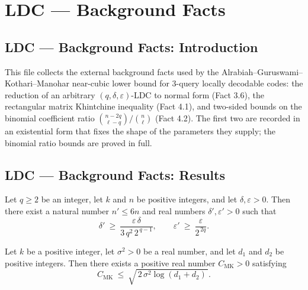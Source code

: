 \section{LDC --- Background Facts}
\subsection*{LDC --- Background Facts: Introduction}

This file collects the external background facts used by the Alrabiah--Guruswami--Kothari--Manohar
near-cubic lower bound for $3$-query locally decodable codes: the reduction of an arbitrary
$(q,\delta,\varepsilon)$-LDC to normal form (Fact 3.6), the rectangular matrix Khintchine
inequality (Fact 4.1), and two-sided bounds on the binomial coefficient ratio
$\binom{n-2q}{\ell-q}/\binom{n}{\ell}$ (Fact 4.2).  The first two are recorded in an
existential form that fixes the shape of the parameters they supply; the binomial ratio
bounds are proved in full.

\subsection*{LDC --- Background Facts: Results}

\begin{theorem}
\label{normal_form_reduction}
\leanok
{}
Let $q \ge 2$ be an integer, let $k$ and $n$ be positive integers, and let $\delta,
\varepsilon > 0$. Then there exist a natural number $n' \le 6n$ and real numbers
$\delta', \varepsilon' > 0$ such that
\[
  \delta' \ \ge\ \frac{\varepsilon\,\delta}{3\,q^{2}\,2^{\,q-1}},
  \qquad
  \varepsilon' \ \ge\ \frac{\varepsilon}{2^{\,2q}}.
\]
\end{theorem}

\begin{theorem}
\label{matrix_khintchine}
\leanok
{}
Let $k$ be a positive integer, let $\sigma^2 > 0$ be a real number, and let $d_1$ and
$d_2$ be positive integers. Then there exists a positive real number $C_{\mathrm{MK}} >
0$ satisfying
\[
  C_{\mathrm{MK}} \ \le\ \sqrt{\,2\,\sigma^2 \log(d_1 + d_2)\,}.
\]
\end{theorem}

